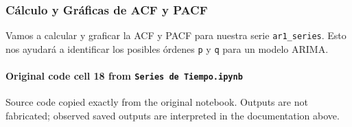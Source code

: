 \documentclass[
  11pt,
]{article}
\begin{document}
\subsubsection{Cálculo y Gráficas de ACF y PACF}\label{cuxe1lculo-y-gruxe1ficas-de-acf-y-pacf}

Vamos a calcular y graficar la ACF y PACF para nuestra serie \texttt{ar1\_series}. Esto nos ayudará a identificar los posibles órdenes \texttt{p} y \texttt{q} para un modelo ARIMA.

\paragraph{\texorpdfstring{Original code cell 18 from \texttt{Series\ de\ Tiempo.ipynb}}{Original code cell 18 from Series de Tiempo.ipynb}}\label{original-code-cell-18-from-series-de-tiempoipynb}

Source code copied exactly from the original notebook. Outputs are not fabricated; observed saved outputs are interpreted in the documentation above.
\end{document}
